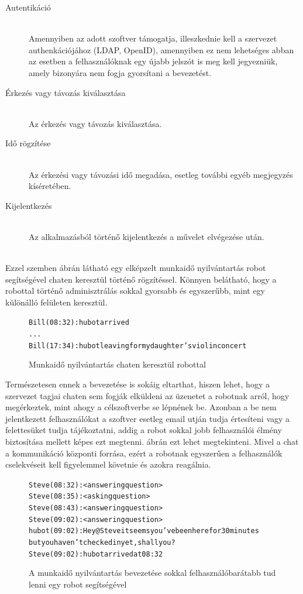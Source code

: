 \begin{description}
  \item[Autentikáció]\hfill\\
  Amennyiben az adott szoftver támogatja, illeszkednie kell a szervezet authenkációjához (LDAP, OpenID), amennyiben ez nem lehetséges abban az esetben a felhasználóknak egy újabb jelszót is meg kell jegyezniük, amely bizonyára nem fogja gyorsítani a bevezetést.
  \item[Érkezés vagy távozás kiválasztása]\hfill\\
  Az érkezés vagy távozás kiválasztása.
  \item[Idő rögzítése]\hfill\\
  Az érkezési vagy távozási idő megadása, esetleg további egyéb megjegyzés kíséretében.
  \item[Kijelentkezés]\hfill\\
  Az alkalmazásból történő kijelentkezés a művelet elvégezése után.
\end{description}
\hfill\\
Ezzel szemben  ábrán látható egy elképzelt munkaidő nyilvántartás robot segítségével chaten keresztül történő rögzítéssel. Könnyen belátható, hogy a robottal történő adminisztrálás sokkal gyorsabb és egyszerűbb, mint egy különálló felületen keresztül.

\begin{figure}[H]
  \begin{alltt}
Bill (08:32): hubot arrived
...
Bill (17:34): hubot leaving for my daughter's violin concert
  \end{alltt}
  \caption[DUMMY]%
    {Munkaidő nyilvántartás chaten keresztül robottal}%
    \label{lst:workhour_with_hubot}
\end{figure}

Természetesen ennek a bevezetése is sokáig eltarthat, hiszen lehet, hogy a szervezet tagjai chaten sem fogják elküldeni az üzenetet a robotnak arról, hogy megérkeztek, mint ahogy a célszoftverbe se lépnének be. Azonban a be nem jelentkezett felhasználókat a szoftver esetleg email utján tudja értesíteni vagy a felettesüket tudja tájékoztatni, addig a robot sokkal jobb felhasználói élmény biztosítása mellett képes ezt megtenni.  ábrán ezt lehet megtekinteni. Mivel a chat a kommunikáció központi forrása, ezért a robotnak egyszerűen a felhasználók cselekvéseit kell figyelemmel követnie és azokra reagálnia.

\begin{figure}[H]
  \begin{alltt}
Steve (08:32): <answering question>
Steve (08:35): <asking question>
Steve (08:43): <answering question>
Steve (09:02): <answering question>
hubot (09:02): Hey @Steve it seems you've been here for 30 minutes
               but you haven't checked in yet, shall you?
Steve (09:02): hubot arrived at 08:32
    \end{alltt}
    \caption[DUMMY]%
    {A munkaidő nyilvántartás bevezetése sokkal felhasználóbarátabb tud lenni egy robot segítségével}%
    \label{lst:workhour_with_hubot_ux}
\end{figure}

